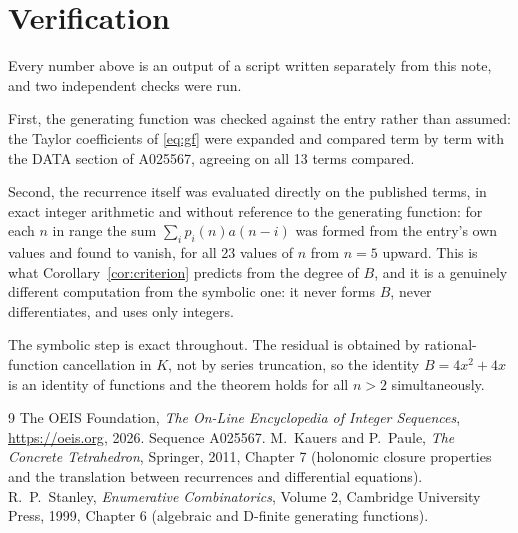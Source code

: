 \documentclass[11pt,a4paper]{article}
\theoremstyle{plain}
\theoremstyle{definition}
\begin{document}
\section{Verification}

Every number above is an output of a script written separately from this note, and two
independent checks were run.

First, the generating function was checked against the entry rather than assumed: the
Taylor coefficients of \eqref{eq:gf} were expanded and compared term by term with the DATA
section of A025567, agreeing on all 13 terms compared.

Second, the recurrence itself was evaluated directly on the published terms, in exact
integer arithmetic and without reference to the generating function: for each $n$ in range
the sum $\sum_{i}p_{i}(n)a(n-i)$ was formed from the entry's own values and found to
vanish, for all 23 values of $n$ from $n=5$ upward. This is what
Corollary~\ref{cor:criterion} predicts from the degree of $B$, and it is a genuinely
different computation from the symbolic one: it never forms $B$, never differentiates, and
uses only integers.

The symbolic step is exact throughout. The residual is obtained by rational-function
cancellation in $K$, not by series truncation, so the identity $B=4 x^{2} + 4 x$ is an
identity of functions and the theorem holds for all $n>2$ simultaneously.

\begin{thebibliography}{9}
 The OEIS Foundation, \emph{The On-Line Encyclopedia of Integer Sequences},
\url{https://oeis.org}, 2026. Sequence A025567.
 M.~Kauers and P.~Paule, \emph{The Concrete Tetrahedron}, Springer, 2011,
Chapter 7 (holonomic closure properties and the translation between recurrences and
differential equations).
 R.~P.~Stanley, \emph{Enumerative Combinatorics}, Volume 2, Cambridge
University Press, 1999, Chapter 6 (algebraic and D-finite generating functions).
\end{thebibliography}
\end{document}
